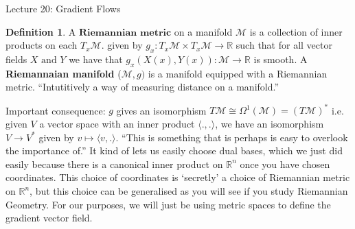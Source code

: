 \documentclass[10pt]{article}
\theoremstyle{plain}
\theoremstyle{definition}
\newtheorem{defn}[thm]{Definition} %
\newcommand{\myand}{\text{ and }}
\newcommand{\Real}{\mathbb{R}}
\newcommand{\man}{\mathcal{M}}
\newcommand{\tang}{T_x\man}
\newcommand{\tangbundle}{T\man}
\begin{document}
\begin{section}{Lecture 20: Gradient Flows}
\begin{defn}
    A $\textbf{Riemannian metric}$ on a manifold $\man$ is a collection of inner products on  each $\tang$. given by $g_x:\tang\times\tang \to \Real$ such that for all vector fields $X \myand Y$ we have that $g_x(X(x),Y(x)): \man \to \Real$ is smooth. A \textbf{Riemannaian manifold} ($\man,g)$ is a manifold equipped with a Riemannian metric. ``Intutitively a way of measuring distance on a manifold.''
\end{defn}
Important consequence: $g$ gives an isomorphism $\tangbundle \cong \Omega^1(\man) = (\tangbundle)^*$ i.e. given $V$ a vector space with an inner product $\langle . , .\rangle$, we have an isomorphism $V\to V^*$ given by $v\mapsto \langle v, .\rangle$. ``This is something that is perhaps is easy to overlook the importance of.'' It kind of lets us easily choose dual bases, which we just did easily because there is a canonical inner product on $\Real^n$ once you have chosen coordinates. This choice of coordinates is `secretly' a choice of Riemannian metric on $\Real^n$, but this choice can be generalised as you will see if you study Riemannian Geometry. For our purposes, we will just be using metric spaces to define the gradient vector field. 


\end{section}
\end{document}
